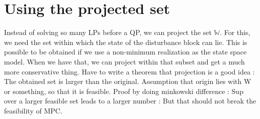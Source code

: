 \documentclass[letterpaper, 10 pt, conference]{ieeeconf}  %
\begin{document}
\section{Using the projected set}
Instead of solving so many LPs before a QP, we can project the set $\mathbb{W}$. For this, we need the set within which the state of the disturbance block can lie. This is possible to be obtained if we use a non-minimum realization as the state space model. When we have that, we can project within that subset and get a much more conservative thing. 
Have to write a theorem that projection is a good idea : The obtained set is larger than the original. Assumption that origin lies with W or something, so that it is feasible. Proof by doing minkowski difference : Sup over a larger feasible set leads to a larger number : But that should not break the feasibility of MPC.
    
    \fi
\end{document}
